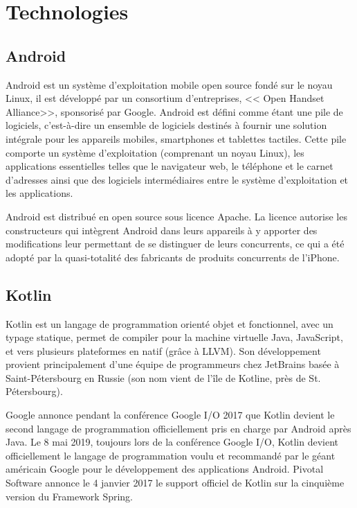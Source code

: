 \section{Technologies}

\subsection{Android}
Android est un système d'exploitation mobile open source fondé sur le noyau Linux, il est développé par un consortium d'entreprises, << Open Handset Alliance>>,\cite*{wiki:Android} sponsorisé par Google. 
Android est défini comme étant une pile de logiciels, c'est-à-dire un ensemble de logiciels destinés à fournir une solution intégrale pour les appareils mobiles, smartphones et tablettes tactiles. Cette pile comporte un système d'exploitation (comprenant un noyau Linux), les applications essentielles  telles que le navigateur web, le téléphone et le carnet d'adresses ainsi que des logiciels intermédiaires entre le système d'exploitation et les applications.

Android est distribué en open source sous licence Apache. La licence autorise les constructeurs qui intègrent Android dans leurs appareils à y apporter des modifications leur permettant de se distinguer de leurs concurrents, ce qui a été adopté par la quasi-totalité des fabricants de produits concurrents de l'iPhone.

\subsection{Kotlin}
Kotlin est un langage de programmation orienté objet et fonctionnel, avec un typage statique, permet de compiler pour la machine virtuelle Java, JavaScript, et vers plusieurs plateformes en natif (grâce à LLVM).\cite*{wiki:Kotlin} Son développement provient principalement d'une équipe de programmeurs chez JetBrains basée à Saint-Pétersbourg en Russie (son nom vient de l'île de Kotline, près de St. Pétersbourg).

Google annonce pendant la conférence Google I/O 2017 que Kotlin devient le second langage de programmation officiellement pris en charge par Android après Java. Le 8 mai 2019, toujours lors de la conférence Google I/O, Kotlin devient officiellement le langage de programmation voulu et recommandé par le géant américain Google pour le développement des applications Android.
Pivotal Software annonce le 4 janvier 2017 le support officiel de Kotlin sur la cinquième version du Framework Spring. 


